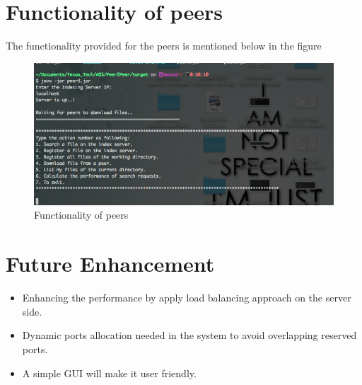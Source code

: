 \documentclass{article}
\begin{document}
\section{Functionality of peers}
The functionality provided for the peers is mentioned below in the figure
\begin{figure} [h]

        \includegraphics[totalheight=8cm]{Func.png}
    \caption{Functionality of peers}
    \label{fig:verticalcell}
\end{figure}

\section{Future Enhancement}
\begin{itemize}
\item Enhancing the performance by apply load balancing approach on the server side.
\item Dynamic ports allocation needed in the system to avoid overlapping reserved
ports.
\item A simple GUI will make it user friendly.

\end{itemize}
\end{document}
